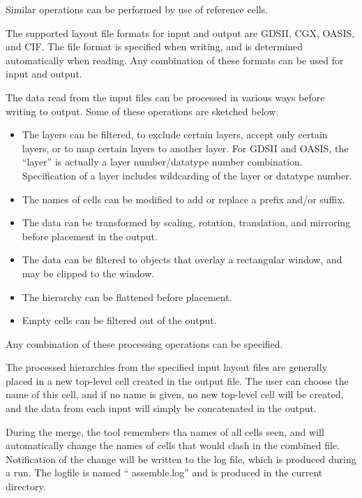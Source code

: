 Similar operations can be performed by use of reference cells.

The supported layout file formats for input and output are GDSII, CGX,
OASIS, and CIF.  The file format is specified when writing, and is
determined automatically when reading.  Any combination of these
formats can be used for input and output.

The data read from the input files can be processed in various ways
before writing to output.  Some of these operations are sketched
below.

\begin{itemize}
\item{The layers can be filtered, to exclude certain layers, accept
only certain layers, or to map certain layers to another layer.  For
GDSII and OASIS, the ``layer'' is actually a layer number/datatype
number combination.  Specification of a layer includes wildcarding of
the layer or datatype number.}

\item{The names of cells can be modified to add or replace a prefix
and/or suffix.}

\item{The data can be transformed by scaling, rotation, translation,
and mirroring before placement in the output.}

\item{The data can be filtered to objects that overlay a rectangular
window, and may be clipped to the window.}

\item{The hierarchy can be flattened before placement.}

\item{Empty cells can be filtered out of the output.}
\end{itemize}

Any combination of these processing operations can be specified.

The processed hierarchies from the specified input layout files are
generally placed in a new top-level cell created in the output file. 
The user can choose the name of this cell, and if no name is given, no
new top-level cell will be created, and the data from each input will
simply be concatenated in the output.

During the merge, the tool remembers tha names of all cells seen, and
will automatically change the names of cells that would clash in the
combined file.  Notification of the change will be written to the log
file, which is produced during a run.  The logfile is named ``{\vt
assemble.log}'' and is produced in the current directory.

